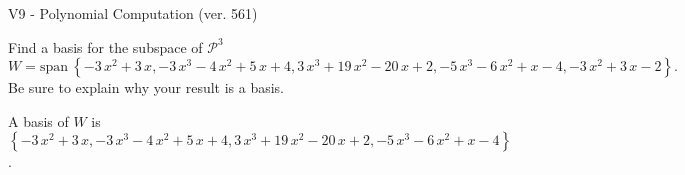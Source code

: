 \begin{exercise}
  \begin{exerciseTitle}V9 - Polynomial Computation (ver. 561)\end{exerciseTitle}
  \begin{exerciseStatement}
    Find a basis for the subspace of \(\mathcal{P}^3\) 
\[W=\mathrm{span}\ \left\{-3 \, x^{2} + 3 \, x , -3 \, x^{3} - 4 \, x^{2} + 5 \, x + 4 , 3 \, x^{3} + 19 \, x^{2} - 20 \, x + 2 , -5 \, x^{3} - 6 \, x^{2} + x - 4 , -3 \, x^{2} + 3 \, x - 2\right\}.\]
 Be sure to explain why your result is a basis.


  \end{exerciseStatement}
  \begin{exerciseAnswer}
   A basis of \(W\) is  \(\left\{-3 \, x^{2} + 3 \, x , -3 \, x^{3} - 4 \, x^{2} + 5 \, x + 4 , 3 \, x^{3} + 19 \, x^{2} - 20 \, x + 2 , -5 \, x^{3} - 6 \, x^{2} + x - 4\right\}\).
  


  \end{exerciseAnswer}
\end{exercise}